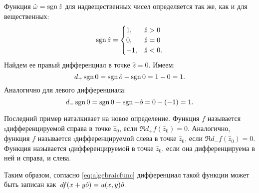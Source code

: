 \begin{example} 
	Функция $\hat{\omega}=\operatorname{sgn}{\hat{z}}$ для надвещественных чисел определяется так же, как и для вещественных:
		\begin{equation*}
			\operatorname{sgn}{\hat{z}} = \begin{cases}
				1, & \hat{z}>0 \\
				0, & \hat{z}=0 \\
				-1, & \hat{z}<0.
			\end{cases}
		\end{equation*}
	Найдем ее правый дифференциал в точке $\hat{z}=0$. Имеем:
		$$d_{+}\operatorname{sgn}{0}=\operatorname{sgn}{\hat{o}}-\operatorname{sgn}{0}=1-0=1.$$
	Аналогично для левого дифференциала:
		$$d_{-}\operatorname{sgn}{0}=\operatorname{sgn}{0}-\operatorname{sgn}{-\hat{o}}=0-(-1)=1.$$
\end{example}
Последний пример наталкивает на новое определение. Функция $f$ называется \i{дифференцируемой справа в точке $\hat{z}_0$}, если $\Re{d_{+}f(\hat{z}_0)}=0$. Аналогично, функция $f$ называется \i{дифференцируемой слева в точке $\hat{z}_0$}, если $\Re{d_{-}f(\hat{z}_0)}=0$. Функция называется \i{дифференцируемой в точке $\hat{z}_0$}, если она дифференцируема в ней и справа, и слева.\par
Таким образом, согласно \eqref{eq:algebraicfunc} дифференциал такой функции может быть записан как~$df(x+y\hat{o})\hm=u(x, y)\hat{o}$.

